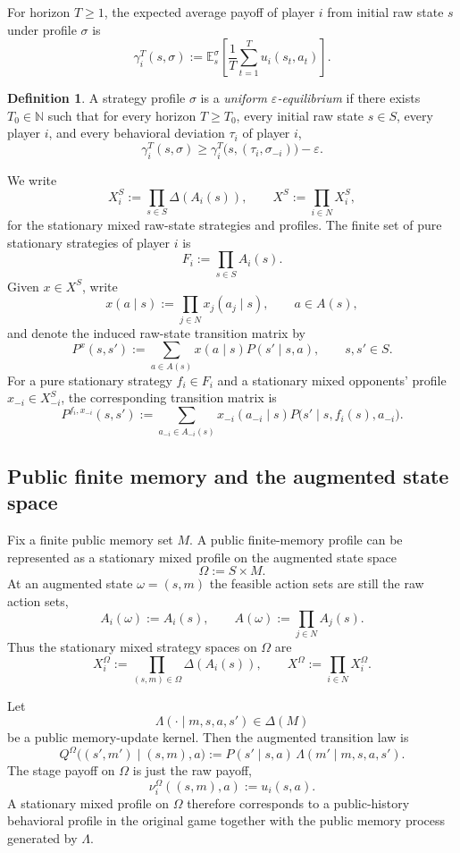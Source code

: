 \documentclass[11pt]{article}
\theoremstyle{definition}
\newtheorem{definition}[theorem]{Definition}
\newcommand{\E}{\mathbb{E}}
\newcommand{\1}{\mathbf{1}}
\begin{document}
For horizon $T\ge1$, the expected average payoff of player $i$ from initial raw state $s$ under profile $\sigma$ is
\[
\gamma_i^T(s,\sigma)
:=\E_s^{\sigma}\!\left[\frac1T\sum_{t=1}^{T}u_i(s_t,a_t)\right].
\]

\begin{definition}
A strategy profile $\sigma$ is a \emph{uniform $\varepsilon$-equilibrium} if there exists $T_0\in\mathbb N$ such that for every horizon $T\ge T_0$, every initial raw state $s\in S$, every player $i$, and every behavioral deviation $\tau_i$ of player $i$,
\[
\gamma_i^T(s,\sigma)
\ge
\gamma_i^T\bigl(s,(\tau_i,\sigma_{-i})\bigr)-\varepsilon.
\]
\end{definition}

We write
\[
X_i^S:=\prod_{s\in S}\Delta(A_i(s)),
\qquad
X^S:=\prod_{i\in N}X_i^S,
\]
for the stationary mixed raw-state strategies and profiles. The finite set of pure stationary strategies of player $i$ is
\[
F_i:=\prod_{s\in S}A_i(s).
\]
Given $x\in X^S$, write
\[
x(a\mid s):=\prod_{j\in N}x_j(a_j\mid s),
\qquad a\in A(s),
\]
and denote the induced raw-state transition matrix by
\[
P^x(s,s'):=\sum_{a\in A(s)}x(a\mid s)P(s'\mid s,a),
\qquad s,s'\in S.
\]
For a pure stationary strategy $f_i\in F_i$ and a stationary mixed opponents' profile $x_{-i}\in X_{-i}^S$, the corresponding transition matrix is
\[
P^{f_i,x_{-i}}(s,s')
:=\sum_{a_{-i}\in A_{-i}(s)}x_{-i}(a_{-i}\mid s)
P\bigl(s'\mid s,f_i(s),a_{-i}\bigr).
\]

\subsection{Public finite memory and the augmented state space}

Fix a finite public memory set $M$. A public finite-memory profile can be represented as a stationary mixed profile on the augmented state space
\[
\Omega:=S\times M.
\]
At an augmented state $\omega=(s,m)$ the feasible action sets are still the raw action sets,
\[
A_i(\omega):=A_i(s),
\qquad
A(\omega):=\prod_{j\in N}A_j(s).
\]
Thus the stationary mixed strategy spaces on $\Omega$ are
\[
X_i^\Omega:=\prod_{(s,m)\in\Omega}\Delta(A_i(s)),
\qquad
X^\Omega:=\prod_{i\in N}X_i^\Omega.
\]

Let
\[
\Lambda(\cdot\mid m,s,a,s')\in\Delta(M)
\]
be a public memory-update kernel. Then the augmented transition law is
\begin{equation}\label{eq:aug-general}
Q^\Omega\bigl((s',m')\mid (s,m),a\bigr)
:=P(s'\mid s,a)\,\Lambda(m'\mid m,s,a,s').
\end{equation}
The stage payoff on $\Omega$ is just the raw payoff,
\[
\nu_i^\Omega((s,m),a):=u_i(s,a).
\]
A stationary mixed profile on $\Omega$ therefore corresponds to a public-history behavioral profile in the original game together with the public memory process generated by $\Lambda$.
\end{document}

